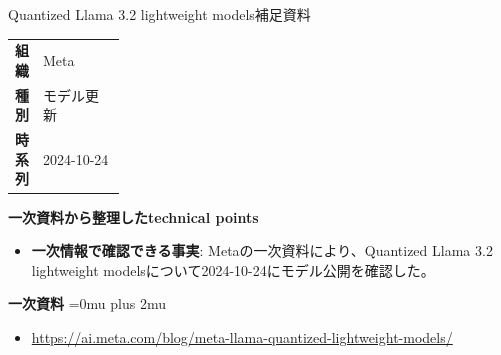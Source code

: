\begin{technicalnote}{Quantized Llama 3.2 lightweight models}{補足資料}
\begingroup
\begin{tabularx}{\linewidth}{@{}>{\bfseries}p{0.22\linewidth}X@{}}
組織 & Meta \\
種別 & モデル更新 \\
時系列 & 2024-10-24 \\
\end{tabularx}
\smallskip
{\bfseries 一次資料から整理したtechnical points}
\begin{itemize}[leftmargin=1.5em,itemsep=0.35em]
\item \textbf{一次情報で確認できる事実}: Metaの一次資料により、Quantized Llama 3.2 lightweight modelsについて2024-10-24にモデル公開を確認した。
\end{itemize}
\begin{minipage}{\linewidth}
\begin{samepage}
{\bfseries 一次資料}
\begingroup\sloppy
\Urlmuskip=0mu plus 2mu\relax
\begin{itemize}[leftmargin=1.5em,itemsep=0.25em]
\item {\scriptsize\url{https://ai.meta.com/blog/meta-llama-quantized-lightweight-models/}}
\end{itemize}
\endgroup
\end{samepage}
\end{minipage}
\endgroup
\end{technicalnote}
\medskip
